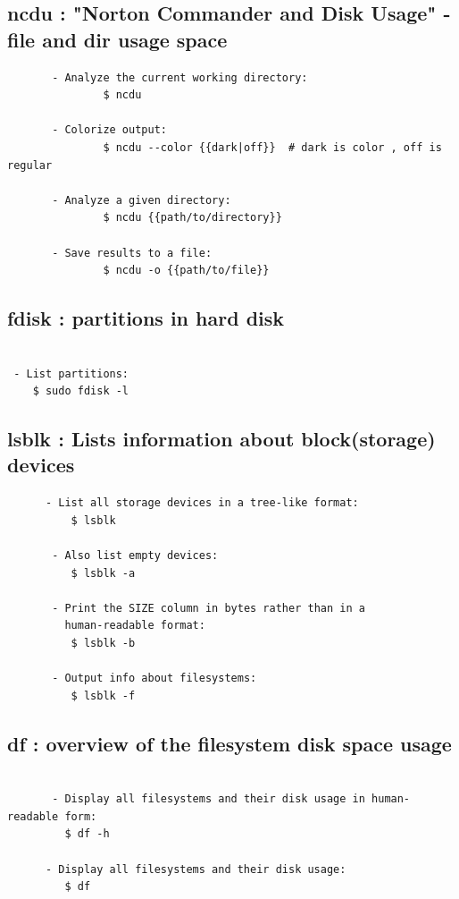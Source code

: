 \documentclass[a4paper,12pt]{article}
\begin{document}
\subsection{ncdu       : "Norton Commander and Disk Usage" - file and dir usage space}
\begin{verbatim}
       - Analyze the current working directory:
               $ ncdu

       - Colorize output:
               $ ncdu --color {{dark|off}}  # dark is color , off is regular

       - Analyze a given directory:
               $ ncdu {{path/to/directory}}

       - Save results to a file:
               $ ncdu -o {{path/to/file}}
\end{verbatim}

\subsection{fdisk       : partitions in hard disk}
\begin{verbatim}

 - List partitions:
    $ sudo fdisk -l

\end{verbatim}

\subsection{lsblk       : Lists information about block(storage) devices}
\begin{verbatim}
      - List all storage devices in a tree-like format:
          $ lsblk

       - Also list empty devices:
          $ lsblk -a

       - Print the SIZE column in bytes rather than in a 
         human-readable format:
          $ lsblk -b

       - Output info about filesystems:
          $ lsblk -f
\end{verbatim}


\subsection{df       : overview of the filesystem disk space usage}
\begin{verbatim}
      
       - Display all filesystems and their disk usage in human-readable form:
         $ df -h

      - Display all filesystems and their disk usage:
         $ df
\end{verbatim}
\end{document}
